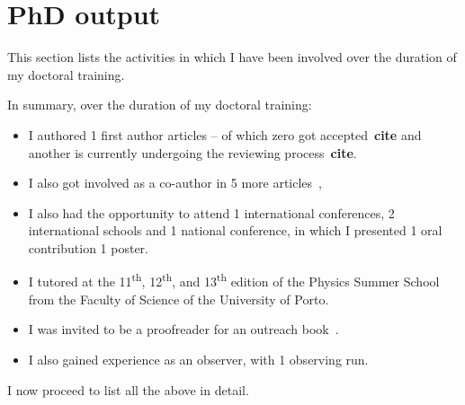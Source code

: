 \chapter{PhD output}\label{app:phd_output}

This section lists the activities in which I have been involved over the duration of my doctoral training.

In summary, over the duration of my doctoral training:
\begin{itemize}
    \item I authored {\red{} 1} first author articles -- of which {\red{} zero} got accepted~\textbf{cite} and another is currently undergoing the reviewing process~\textbf{cite}. 
    \item I also got involved as a co-author in 5 more articles~\citep{figueira_radial_2016, barros_precise_2017, santerne_earthsized_2018, lillo-box_troy_2018, ulmer-moll_telluric_2018},
    \item I also had the opportunity to attend 1 international conferences, 2 international schools and 1 national conference, in which I presented 1 oral contribution 1 poster.
    \item I tutored at the 11\textsuperscript{th}, 12\textsuperscript{th}, and 13\textsuperscript{th} edition of the Physics Summer School from the Faculty of Science of the University of Porto.
    \item I was invited to be a proofreader for an outreach book~\citet{figueira_astro_2015}.
    \item I also gained experience as an observer, with 1 observing run.
\end{itemize}

I now proceed to list all the above in detail.

\clearpage


\clearpage


\clearpage


\clearpage


\clearpage


\clearpage


\clearpage
